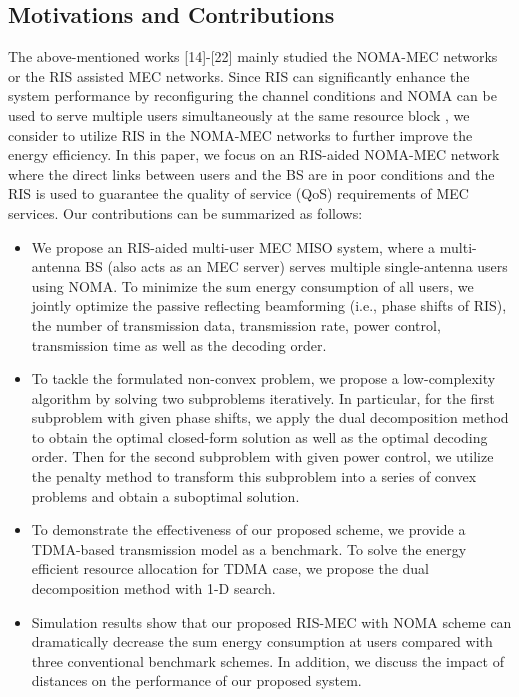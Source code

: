 \documentclass[journal]{IEEEtran}
\begin{document}
\subsection{Motivations and Contributions}
{The above-mentioned works [14]-[22] mainly studied the NOMA-MEC networks or the RIS assisted MEC networks. Since RIS can significantly enhance the system performance by reconfiguring the channel conditions and NOMA can be used to serve multiple users simultaneously at the same resource block \cite{dingz, zhengNOMARIS, yiqingNOMARIS}, we consider to utilize RIS in the NOMA-MEC networks to further improve the energy efficiency. In this paper, we focus on an RIS-aided NOMA-MEC network where the direct links between users and the BS are in poor conditions and the RIS is used to guarantee the quality of service (QoS) requirements of  MEC services. Our contributions can be summarized as follows:
\begin{itemize}
	\item  We propose an RIS-aided multi-user MEC MISO system, where a multi-antenna BS (also acts as an MEC server) serves multiple single-antenna users using NOMA. To minimize the sum energy consumption of all users, we jointly optimize the passive reflecting beamforming (i.e., phase shifts of RIS), the number of transmission data, transmission rate, power control, transmission time as well as the decoding order.
	\item To tackle the formulated non-convex problem, we propose a low-complexity algorithm by solving two subproblems iteratively. In particular, for the first subproblem with given phase shifts, we apply the dual decomposition method to obtain the optimal closed-form solution as well as the optimal decoding order. Then for the second subproblem with given power control, we utilize the penalty method to transform this subproblem into a series of convex problems and obtain a suboptimal solution.
	\item  To demonstrate the effectiveness of our proposed scheme, we provide a TDMA-based transmission model as a benchmark. To solve the energy efficient resource allocation for TDMA case, we propose the dual decomposition method with 1-D search.
	\item Simulation results show that our proposed RIS-MEC with NOMA scheme can dramatically decrease the sum energy consumption at users compared with three conventional benchmark schemes. In addition, we discuss the impact of distances on the performance of our proposed system.
\end{itemize}}
\end{document}

